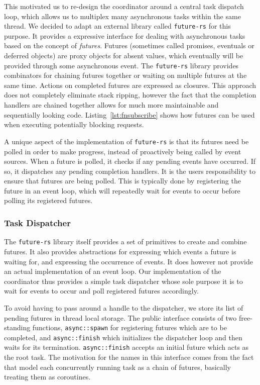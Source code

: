 This motivated us to re-design the coordinator around a central task dispatch loop, which
allows us to multiplex many asynchronous tasks within the same thread. We decided to adapt
an external library called \lstinline{future-rs} \cite{futuresrs} for this purpose.
It provides a expressive interface for dealing with asynchronous tasks based
on the concept of \emph{futures}. Futures (sometimes called promises, eventuals
or deferred objects) are proxy objects for absent values, which eventually will
be provided through some asynchronous event.
The \lstinline{future-rs} library provides combinators for chaining futures
together or waiting on multiple futures at the same time. Actions on completed
futures are expressed as closures. This approach does not completely eliminate
stack ripping, however the fact that the completion handlers are chained together
allows for much more maintainable and sequentially looking code. Listing~\ref{lst:fnsubscribe}
shows how futures can be used when executing potentially blocking requests.

A unique aspect of the implementation of \lstinline{future-rs} is that its futures
need be polled in order to make progress, instead of proactively being called
by event sources. When a future is polled, it checks if any pending events
have occurred. If so, it dispatches any pending completion handlers. 
It is the users responsibility to ensure that futures are being
polled. This is typically done by registering the future in an event loop,
which will repeatedly wait for events to occur before polling its registered
futures.

\subsubsection{Task Dispatcher}
The \lstinline{future-rs} library itself provides a set of primitives to
create and combine futures. It also provides abstractions for expressing which
events a future is waiting for, and expressing the occurrence of events. It
does however not provide an actual implementation of an event loop. Our implementation
of the coordinator thus provides a simple task dispatcher whose sole purpose it is
to wait for events to occur and poll registered futures accordingly.

To avoid having to pass around a handle to the dispatcher, we store its 
list of pending futures in thread local storage. The public interface consists 
of two free-standing functions, \lstinline{async::spawn} for registering
futures which are to be completed, and \lstinline{async::finish} which initializes
the dispatcher loop and then waits for its termination.
\lstinline{async::finish} accepts an initial future which acts as the root task.
The motivation for the names in this interface comes from the fact that model
each concurrently running task as a chain of futures, basically treating them as
coroutines.

